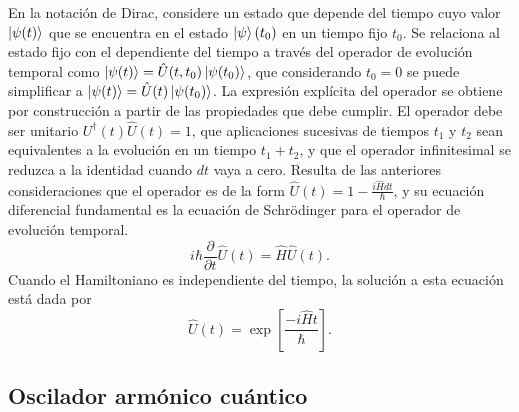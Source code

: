 En la notación de Dirac, considere un estado que depende del tiempo cuyo valor $\ket{\psi(t)}$ que se encuentra en el estado $\ket{\psi}(t_0)$ en un tiempo fijo $t_0$. Se relaciona al estado fijo con el dependiente del tiempo a través del operador de evolución temporal como $\ket{\psi(t)} = \hat{U}(t, t_0) \ket{\psi(t_0)}$, que considerando $t_0=0$ se puede simplificar a $\ket{\psi(t)} = \hat{U}(t) \ket{\psi(t_0)}$. La expresión explícita del operador se obtiene por construcción a partir de las propiedades que debe cumplir. El operador debe ser unitario $U^\dagger(t)\hat{U}(t) = 1$, que aplicaciones sucesivas de tiempos $t_1$ y $t_2$ sean equivalentes a la evolución en un tiempo $t_1+t_2$, y que el operador infinitesimal se reduzca a la identidad cuando $dt$ vaya a cero. Resulta de las anteriores consideraciones que el operador es de la form $\hat{U}(t) = 1-\frac{i\hat{H}dt}{\hbar}$, y su ecuación diferencial fundamental es la ecuación de Schrödinger para el operador de evolución temporal.
\begin{equation}
  i\hbar\frac{\partial}{\partial t} \hat{U}(t) = \hat{H}\hat{U}(t).
\end{equation}
Cuando el Hamiltoniano es independiente del tiempo, la solución a esta ecuación está dada por
\begin{equation*}
  \hat{U}(t) = \exp{\left[ \frac{-i\hat{H}t}{\hbar} \right] }.
\end{equation*}
\subsection{Oscilador armónico cuántico}

